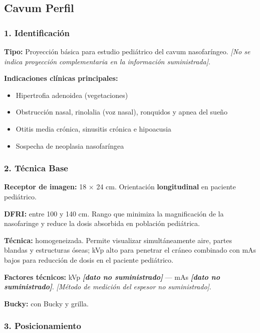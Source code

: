 \subsection{Cavum Perfil}

\subsubsection*{1. Identificación}

\textbf{Tipo:} Proyección básica para estudio pediátrico del cavum nasofaríngeo. \textit{[No se indica proyección complementaria en la información suministrada]}.

\textbf{Indicaciones clínicas principales:}
\begin{itemize}
	\item Hipertrofia adenoidea (vegetaciones)
	\item Obstrucción nasal, rinolalia (voz nasal), ronquidos y apnea del sueño
	\item Otitis media crónica, sinusitis crónica e hipoacusia
	\item Sospecha de neoplasia nasofaríngea
\end{itemize}

\subsubsection*{2. Técnica Base}

\textbf{Receptor de imagen:} 18 $\times$ 24 cm. Orientación \textbf{longitudinal} en paciente pediátrico.

\textbf{DFRI:} entre 100 y 140 cm. Rango que minimiza la magnificación de la nasofaringe y reduce la dosis absorbida en población pediátrica.

\textbf{Técnica:} homogeneizada. Permite visualizar simultáneamente aire, partes blandas y estructuras óseas; kVp alto para penetrar el cráneo combinado con mAs bajos para reducción de dosis en el paciente pediátrico.

\textbf{Factores técnicos:} kVp \textbf{\textit{[dato no suministrado]}} --- mAs \textbf{\textit{[dato no suministrado]}}. \textit{[Método de medición del espesor no suministrado]}.

\textbf{Bucky:} con Bucky y grilla.

\subsubsection*{3. Posicionamiento}

